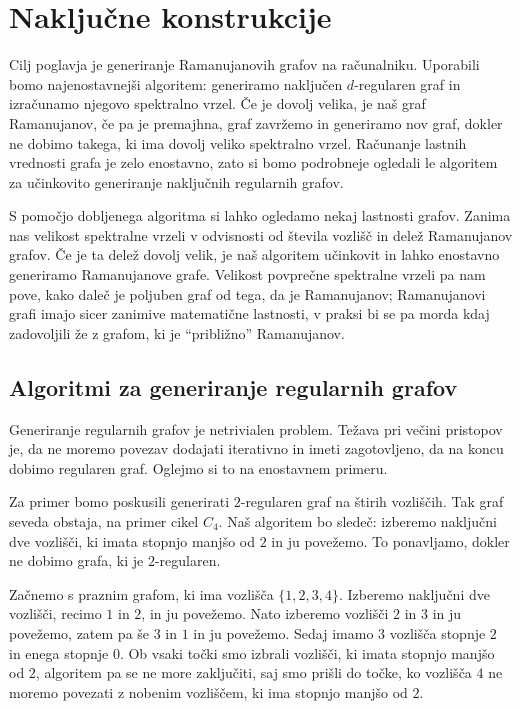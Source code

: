 \section{Naključne konstrukcije}
Cilj poglavja je generiranje Ramanujanovih grafov na računalniku. Uporabili bomo najenostavnejši algoritem: generiramo naključen \(d\)-regularen graf in izračunamo njegovo spektralno vrzel. Če je dovolj velika, je naš graf Ramanujanov, če pa je premajhna, graf zavržemo in generiramo nov graf, dokler ne dobimo takega, ki ima dovolj veliko spektralno vrzel. Računanje lastnih vrednosti grafa je zelo enostavno, zato si bomo podrobneje ogledali le algoritem za učinkovito generiranje naključnih regularnih grafov.

S pomočjo dobljenega algoritma si lahko ogledamo nekaj lastnosti grafov. Zanima nas velikost spektralne vrzeli v odvisnosti od števila vozlišč in delež Ramanujanov grafov. Če je ta delež dovolj velik, je naš algoritem učinkovit in lahko enostavno generiramo Ramanujanove grafe. Velikost povprečne spektralne vrzeli pa nam pove, kako daleč je poljuben graf od tega, da je Ramanujanov; Ramanujanovi grafi imajo sicer zanimive matematične lastnosti, v praksi bi se pa morda kdaj zadovoljili že z grafom, ki je ``približno'' Ramanujanov.

\subsection{Algoritmi za generiranje regularnih grafov}
Generiranje regularnih grafov je netrivialen problem. Težava pri večini pristopov je, da ne moremo povezav dodajati iterativno in imeti zagotovljeno, da na koncu dobimo regularen graf. Oglejmo si to na enostavnem primeru.

\begin{primer}
    Za primer bomo poskusili generirati \(2\)-regularen graf na štirih vozliščih. Tak graf seveda obstaja, na primer cikel \(C_4\). Naš algoritem bo sledeč: izberemo naključni dve vozlišči, ki imata stopnjo manjšo od \(2\) in ju povežemo. To ponavljamo, dokler ne dobimo grafa, ki je \(2\)-regularen.

    Začnemo s praznim grafom, ki ima vozlišča \(\{1, 2, 3, 4\}\). Izberemo naključni dve vozlišči, recimo \(1\) in \(2\), in ju povežemo. Nato izberemo vozlišči \(2\) in \(3\) in ju povežemo, zatem pa še \(3\) in \(1\) in ju povežemo. Sedaj imamo \(3\) vozlišča stopnje \(2\) in enega stopnje \(0\). Ob vsaki točki smo izbrali vozlišči, ki imata stopnjo manjšo od \(2\), algoritem pa se ne more zaključiti, saj smo prišli do točke, ko vozlišča \(4\) ne moremo povezati z nobenim vozliščem, ki ima stopnjo manjšo od \(2\).
\end{primer}

